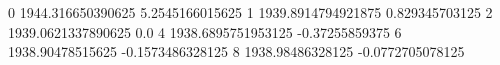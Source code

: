 0 1944.316650390625 5.2545166015625
1 1939.8914794921875 0.829345703125
2 1939.0621337890625 0.0
4 1938.6895751953125 -0.37255859375
6 1938.90478515625 -0.1573486328125
8 1938.98486328125 -0.0772705078125
